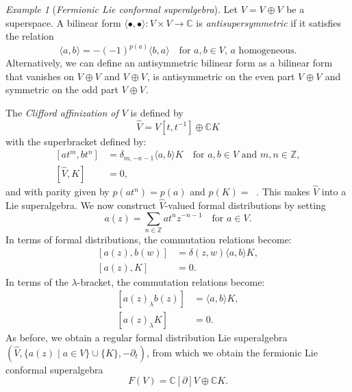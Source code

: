 \documentclass[a4paper, 12pt, reqno]{amsart}
\theoremstyle{remark}
\newtheorem{example}[theorem]{Example}
\DeclareMathOperator{\zero}{\overline{0}}
\DeclareMathOperator{\one}{\overline{1}}
\begin{document}
\begin{example}[\emph{Fermionic Lie conformal superalgebra}]
  \label{exa:3}
  Let $V = V_{\zero} \oplus V_{\one}$ be a superspace.
  A bilinear form $\langle\bullet, \bullet\rangle: V \times V \to \mathbb{C}$ is \emph{antisupersymmetric} if it satisfies the relation
  \begin{equation*}
    \langle a, b\rangle = -(-1)^{p(a)}\langle b, a\rangle \quad \text{for $a, b \in V$, $a$ homogeneous}.
  \end{equation*}
  Alternatively, we can define an antisymmetric bilinear form as a bilinear form that vanishes on $V_{\zero} \oplus V_{\one}$ and $V_{\one} \oplus V_{\zero}$, is antisymmetric on the even part $V_{\zero} \oplus V_{\zero}$ and symmetric on the odd part $V_{\one} \oplus V_{\one}$.

  The \emph{Clifford affinization of $V$} is defined by
  \begin{equation*}
    \widehat{V} = V[t, t^{-1}] \oplus \mathbb{C}K
  \end{equation*}
  with the superbracket defined by:
  \begin{equation*}
    \begin{split}
      [at^m, bt^n] &= \delta_{m, -n - 1}\langle a, b\rangle K \quad \text{for $a, b \in V$ and $m, n \in \mathbb{Z}$}, \\
      [\widehat{V}, K] &= 0,
    \end{split}
  \end{equation*}
  and with parity given by $p(at^n) = p(a)$ and $p(K) = \zero$.
  This makes $\widehat{V}$ into a Lie superalgebra.
  We now construct $\widehat{V}$-valued formal distributions by setting
  \begin{equation*}
    a(z) = \sum_{n \in \mathbb{Z}}at^nz^{-n - 1} \quad \text{for $a \in V$}.
  \end{equation*}
  In terms of formal distributions, the commutation relations become:
  \begin{equation*}
    \begin{split}
      [a(z), b(w)] &= \delta(z, w)\langle a, b\rangle K, \\
      [a(z), K] &= 0.
    \end{split}
  \end{equation*}
  In terms of the $\lambda$-bracket, the commutation relations become:
  \begin{equation*}
    \begin{split}
      [a(z)_{\lambda}b(z)] &= \langle a, b\rangle K, \\
      [a(z)_{\lambda}K] &= 0.
    \end{split}
  \end{equation*}
  As before, we obtain a regular formal distribution Lie superalgebra $(\widehat{V}, \{a(z) \mid a \in V\} \cup \{K\}, -\partial_t)$, from which we obtain the fermionic Lie conformal superalgebra
  \begin{equation*}
    F(V) = \mathbb{C}[\partial]V \oplus \mathbb{C}K.
  \end{equation*}
\end{example}
\end{document}
